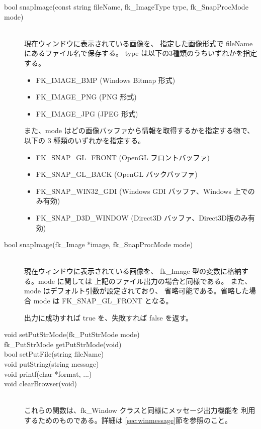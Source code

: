\begin{description}
 \item[\hspace*{0.6cm}bool snapImage(const string fileName,
			fk\_ImageType type,
			fk\_SnapProcMode mode)] ~ \\
	現在ウィンドウに表示されている画像を、
	指定した画像形式で fileName にあるファイル名で保存する。
	type は以下の3種類のうちいずれかを指定する。
	\begin{itemize}
	 \item FK\_IMAGE\_BMP (Windows Bitmap 形式)
	 \item FK\_IMAGE\_PNG (PNG 形式)
	 \item FK\_IMAGE\_JPG (JPEG 形式)
	\end{itemize}
	また、mode はどの画像バッファから情報を取得するかを指定する物で、
	以下の 3 種類のいずれかを指定する。
	\begin{itemize}
	 \item FK\_SNAP\_GL\_FRONT (OpenGL フロントバッファ)
	 \item FK\_SNAP\_GL\_BACK (OpenGL バックバッファ)
	 \item FK\_SNAP\_WIN32\_GDI
	 (Windows GDI バッファ、Windows 上でのみ有効)
	 \item FK\_SNAP\_D3D\_WINDOW
	(Direct3D バッファ、Direct3D版のみ有効)
	\end{itemize}

 \item[\hspace*{0.6cm}bool snapImage(fk\_Image *image,
				fk\_SnapProcMode mode)] ~ \\
	現在ウィンドウに表示されている画像を、
	fk\_Image 型の変数に格納する。mode に関しては
	上記のファイル出力の場合と同様である。
	また、mode はデフォルト引数が設定されており、
	省略可能である。省略した場合 mode は FK\_SNAP\_GL\_FRONT となる。

	出力に成功すれば true を、失敗すれば false を返す。
 \item[\hspace*{0.6cm}void setPutStrMode(fk\_PutStrMode mode)]
 \item[\hspace*{0.6cm}fk\_PutStrMode getPutStrMode(void)]
 \item[\hspace*{0.6cm}bool setPutFile(string fileName)]
 \item[\hspace*{0.6cm}void putString(string message)]
 \item[\hspace*{0.6cm}void printf(char *format, ...)]
 \item[\hspace*{0.6cm}void clearBrowser(void)] ~ \\
	これらの関数は、fk\_Window クラスと同様にメッセージ出力機能を
	利用するためのものである。詳細は \ref{sec:winmessage}節を参照のこと。

\end{description}
